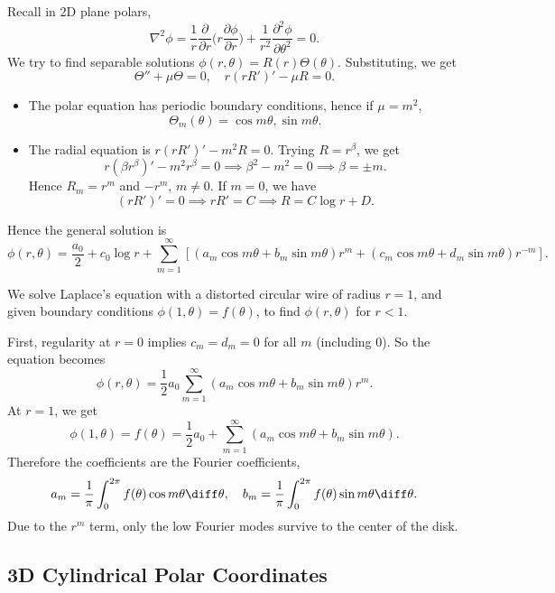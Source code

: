 \documentclass[12pt]{article}
\begin{document}
Recall in 2D plane polars,
\[
	\nabla^2 \phi = \frac{1}{r} \frac{\partial}{\partial r} \biggl( r \frac{\partial \phi}{\partial r} \biggr) + \frac{1}{r^2} \frac{\partial^2 \phi}{\partial \theta^2} = 0
.\]
We try to find separable solutions $\phi(r, \theta) = R(r) \Theta(\theta)$. Substituting, we get
\[
	\Theta'' + \mu \Theta = 0, \quad r(rR')' - \mu R = 0
.\]
\begin{itemize}
	\item The polar equation has periodic boundary conditions, hence if $\mu = m^2$,
		\[
			\Theta_m(\theta) = \cos m \theta, \sin m \theta
		.\]
	\item The radial equation is $r(rR')' - m^2R = 0$. Trying $R =  r^{\beta}$, we get
		\[
			r(\beta r^{\beta})' - m^2 r^{\beta} = 0 \implies \beta^2 - m^2 = 0 \implies \beta = \pm m
		.\]
		Hence $R_m = r^{m}$ and $-r^{m}$, $m \neq 0$. If $m = 0$, we have
		\[
			(r R')' = 0 \implies r R' = C \implies R = C \log r + D
		.\]
\end{itemize}
Hence the general solution is
\[
	\phi(r, \theta) = \frac{a_0}{2} + c_0 \log r + \sum_{m = 1}^{\infty}[(a_m \cos m \theta + b_m \sin m \theta)r^{m} + (c_m \cos m \theta + d_m \sin m \theta) r^{-m}]
.\]

\begin{exbox}
	We solve Laplace's equation with a distorted circular wire of radius $r = 1$, and given boundary conditions $\phi(1, \theta) = f(\theta)$, to find $\phi(r, \theta)$ for $r < 1$.

	First, regularity at $r = 0$ implies $c_m = d_m = 0$ for all $m$ (including $0$). So the equation becomes
	\[
		\phi(r, \theta) = \frac{1}{2}a_0 \sum_{m = 1}^{\infty}(a_m \cos m \theta + b_m \sin m \theta)r^{m}
	.\]
	At $r = 1$, we get
	\[
		\phi(1, \theta) = f(\theta) = \frac{1}{2}a_0 + \sum_{m = 1}^{\infty}(a_m \cos m \theta + b_m \sin m \theta)
	.\]
	Therefore the coefficients are the Fourier coefficients,
	\[
		a_m = \frac{1}{\pi} \int_{0}^{2 \pi}f(\theta) \cos m \theta \diff \theta, \quad b_m = \frac{1}{\pi} \int_{0}^{2 \pi}f(\theta) \sin m \theta \diff \theta
	.\]
	Due to the $r^{m}$ term, only the low Fourier modes survive to the center of the disk.
\end{exbox}

\subsection{3D Cylindrical Polar Coordinates}%
\label{sub:3d_cylindrical_polar_coordinates}
\end{document}
